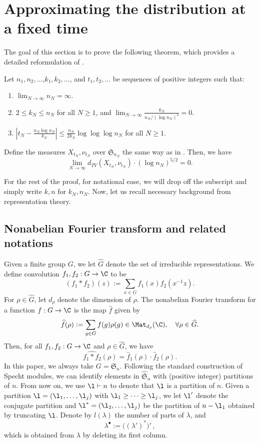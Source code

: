 \section{Approximating the distribution at a fixed time}\label{sec: Jain-Sawhney}

The goal of this section is to prove the following theorem, which provides a detailed reformulation of .

\begin{thm}\label{thm: restate of X and nu}
Let $n_1,n_2,\ldots$,$k_1,k_2,\ldots$, and $t_1,t_2,\ldots$ be sequences of positive integers such that:
\begin{enumerate}
\item $\lim_{N\rightarrow\infty}n_N=\infty$.
\item $2\le k_N\le n_N$ for all $N\ge 1$, and $\lim_{N\rightarrow\infty}\frac{k_N}{n_N/(\log n_N)^4}=0$.
\item $|t_N-\frac{n_N\log n_N}{k_N}|\le \frac{n_N}{2k_N}\log\log\log n_N$ for all $N\ge 1$. 
\end{enumerate}
Define the measures $X_{t_N},\nu_{t_N}$ over $\mathfrak{S}_{n_N}$ the same way as in . Then, we have 
$$\lim_{N\rightarrow\infty}d_{TV}(X_{t_N},\nu_{t_N})\cdot(\log n_N)^{5/2}=0.$$
\end{thm}

For the rest of the proof, for notational ease, we will drop off the subscript and simply write $k,n$ for $k_N,n_N$. Now, let us recall necessary background from representation theory.

\subsection{Nonabelian Fourier transform and related notations}

Given a finite group $G$, we let $\widehat G$ denote the set of irreducible representations. We define convolution $f_1,f_2:G\rightarrow\C$ to be
$$(f_1*f_2)(z):=\sum_{x\in G}f_1(x)f_2(x^{-1}z).$$
For $\rho\in \widehat G$, let $d_\rho$ denote the dimension of $\rho$. The nonabelian Fourier transform for a function $f:G\rightarrow\C$ is the map $\widehat f$ given by
$$\widehat f(\rho):=\sum_{g\in G}f(g)\rho(g)\in\Mat_{d_\rho}(\C),\quad\forall \rho\in\widehat G.$$
Then, for all $f_1,f_2:G\rightarrow\C$ and $\rho\in\widehat G$, we have
\begin{equation}\label{eq: convolution to multiplication}
\widehat{f_1*f_2}(\rho)=\widehat f_1(\rho)\cdot\widehat f_2(\rho).
\end{equation}
In this paper, we always take $G=\mathfrak{S}_n$. Following the standard construction of Specht modules, we can identify elements in $\widehat{\mathfrak{S}}_n$ with (positive integer) partitions of $n$. From now on, we use $\l\vdash n$ to denote that $\l$ is a partition of $n$. Given a partition $\l=(\l_1,\ldots,\l_j)$ with $\l_1\ge\cdots\ge\l_j$, we let $\l'$ denote the conjugate partition and $\l^*=(\l_2,\ldots,\l_j)$ be the partition of $n-\l_1$ obtained by truncating $\l$. Denote by $l(\lambda)$ the number of parts of $\lambda$, and
$$
\lambda^\bullet:=\bigl((\lambda')^*\bigr)'\,,
$$
which is obtained from $\lambda$ by deleting its first column. 

